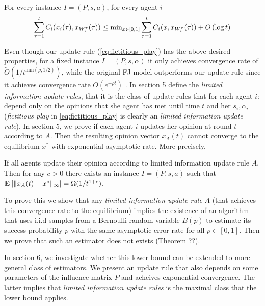 \begin{theorem}\label{t:fictitious_noregret}
For every instance $I=(P,s,a)$, for every agent $i$
\[\sum_{\tau=1}^tC_i(x_i(\tau),x_{W_i^\tau}(\tau)) \leq \text{min}_{x \in [0,1]}\sum_{\tau=1}^tC_i(x,x_{W_i^\tau}(\tau)) + O\left(\log t\right)\]
\end{theorem}

Even though our update rule (\ref{eq:fictitious_play}) has the above
desired properties, for a fixed instance $I=(P,s,\alpha)$ it only achieves convergence rate of
$\widetilde{O}(1/t^{\text{min}(\rho,1/2)})$, while the original FJ-model outperforms
our update rule since it achieves convergence rate $O(e^{-\rho t})$ \cite{GS14}.
In section 5 define the \emph{limited information update rules}, that it is the class
of update rules that for each agent $i$: depend only on the opinions that she agent has met
until time $t$ and her $s_i,\alpha_i$ (\emph{fictitious play} in \ref{eq:fictitious_play} 
is clearly an \emph{limited information update rule}).
In section 5, we prove if each agent $i$ updates her 
opinion at round $t$ according to $A$. Then the resulting opinion vector $x_A(t)$ cannot converge to the equilibrium $x^*$ 
with exponential asymptotic rate. More precisely,
\begin{theorem}\label{thm:lower_bound}
If all agents update their opinion according to limited information update rule $A$. Then for any $c>0$ there
exists an instance $I=(P,s,a)$ such that $\Exp{\norm{\infty}{x_A(t) - x^*}} = \Omega(1/t^{1+c})$.
\end{theorem}

To prove this we show that any \emph{limited information update rule} $A$
(that achieves this convergence rate to the equilibrium) implies
the existence of an algorithm that uses i.i.d samples from a Bernoulli random
variable $B(p)$ to estimate its success probability $p$ with the same asymptotic
error rate for all $p \in [0,1]$. Then we prove that such an estimator does not exists (Theorem ??).

In section 6, we investigate whether this lower bound can be extended to more
general class of estimators. We present an update rule that also depends on some parameters of the influence matrix $P$ 
and acheives exponential convergence. The latter implies that \emph{limited information update rules}
is the maximal class that the lower bound applies.


